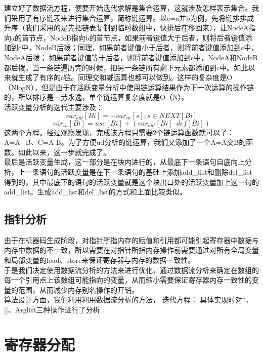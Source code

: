 \documentclass[12pt,a4paper,Flow]{report}
\begin{document}
\indent 建立好了数据流方程，便要开始迭代求解是集合运算，这就涉及怎样表示集合。我们采用了有序链表来进行集合运算，简称链运算。以c=a并b为例，先将链排排成升序（我们采用的是先把链表复制到临时数组中，快排后在移回来），让NodeA指向a的首节点，NodeB指向b的首节点，如果前者键值大于后者，则将后者键值添加到c中，NodeB后拨；同理，如果前者键值小于后者，则将前者键值添加到c中，NodeA后拨； 如果前者键值等于后者，则将前者键值添加到c中，NodeA和NodeB都后拨。当一条链遍历完的时候，把另一条链所有剩下元素都添加到c中。如此以来就生成了有序的c链。同理交和减运算也都可以做到。这样的复杂度是O（NlogN），但是由于在活跃变量分析中使用链运算结果作为下一次运算的操作链的，所以排序是一劳永逸，单个链运算复杂度就是O（N）。\\
\indent 活跃变量分析的迭代主要涉及：
\begin{displaymath}
	var_{out}[Bi] = +var_{in}[s];s\in NEXT[Bi]
\end{displaymath}
\begin{displaymath}
	var_{in}[Bi] = use[Bi] + (var_{out}[Bi] – def[Bi])
\end{displaymath}
这两个方程。经过观察发现，完成该方程只需要2个链运算函数就可以了：A=A+B、C=A-B。为了方便ud分析的链运算，我们又添加了一个A=A交B的函数。如此以来，这一步就完成了。\\
最后是活跃变量生成，这一部分是在块内进行的，从最底下一条语句自底向上分析，上一条语句的活跃变量是在下一条语句的基础上添加add\_list和删除del\_list得到的，其中最底下的语句的活跃变量就是这个块出口处的活跃变量加上这一句的add\_list。生成add\_list和del\_list的方式和上面比较类似。\\
\subsection{指针分析}
由于在机器码生成阶段，对指针所指内存的赋值和引用都可能引起寄存器中数据与内存中数据的不一致，所以需要在对指针所指内存操作前需要通过对所有全局变量和局部变量的load、store来保证寄存器与内存的数据一致性。\\
\indent 于是我们决定使用数据流分析的方法来进行优化，通过数据流分析来确定在数组的每一个引用点上该数组可能指向的变量，从而缩小需要保证寄存器内存一致性的变量的范围，从而减少内存别名操作的开销。\\
\indent 算法设计方面，我们利用利用数据流分析的方法，
	迭代方程：
具体实现时对*、[]、Arglist三种操作进行了分析
\section{寄存器分配}
\end{document}
